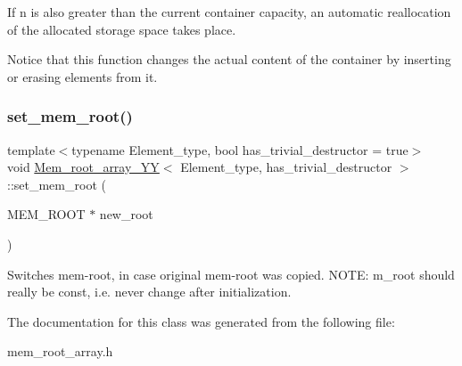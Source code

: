 If n is also greater than the current container capacity, an automatic reallocation of the allocated storage space takes place.

Notice that this function changes the actual content of the container by inserting or erasing elements from it. \mbox{\label{classMem__root__array__YY_a777a34213998be27410cc67f086464a0}} 
\subsubsection{\texorpdfstring{set\+\_\+mem\+\_\+root()}{set\_mem\_root()}}
{\footnotesize\ttfamily template$<$typename Element\+\_\+type, bool has\+\_\+trivial\+\_\+destructor = true$>$ \\
void \mbox{\hyperlink{classMem__root__array__YY}{Mem\+\_\+root\+\_\+array\+\_\+\+YY}}$<$ Element\+\_\+type, has\+\_\+trivial\+\_\+destructor $>$\+::set\+\_\+mem\+\_\+root (\begin{DoxyParamCaption}\item[{M\+E\+M\+\_\+\+R\+O\+OT $\ast$}]{new\+\_\+root }\end{DoxyParamCaption})\hspace{0.3cm}{\ttfamily [inline]}}

Switches mem-\/root, in case original mem-\/root was copied. N\+O\+TE\+: m\+\_\+root should really be const, i.\+e. never change after initialization. 

The documentation for this class was generated from the following file\+:\begin{DoxyCompactItemize}
\item 
mem\+\_\+root\+\_\+array.\+h\end{DoxyCompactItemize}
